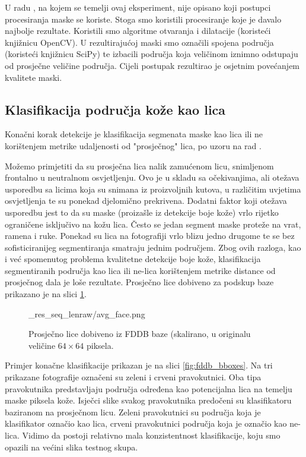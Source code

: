 \documentclass[times, utf8, seminar, numeric]{fer}
\begin{document}
U radu \cite{conf/isda/ChandrappaR12}, na kojem se
temelji ovaj eksperiment, nije opisano koji postupci procesiranja maske se koriste. Stoga smo
koristili procesiranje koje je davalo najbolje rezultate. Koristili smo algoritme otvaranja i
dilatacije (koristeći knjižnicu OpenCV). U rezultirajućoj maski smo označili spojena područja
(koristeći knjižnicu SciPy) te izbacili područja koja veličinom iznimno odstupaju od prosječne
veličine područja. Cijeli postupak rezultirao je osjetnim povećanjem kvalitete maski.

\subsection{Klasifikacija područja kože kao lica}

Konačni korak detekcije je klasifikacija segmenata maske kao lica ili ne korištenjem
metrike udaljenosti od "prosječnog" lica, po uzoru na rad \cite{conf/isda/ChandrappaR12}.


Možemo primjetiti da su prosječna lica nalik zamućenom licu, snimljenom frontalno u neutralnom osvjetljenju.
Ovo je u skladu sa očekivanjima, ali otežava usporedbu sa licima koja su snimana iz proizvoljnih kutova,
u različitim uvjetima osvjetljenja te su ponekad djelomično prekrivena. Dodatni faktor koji otežava usporedbu
jest to da su maske (proizašle iz detekcije boje kože) vrlo rijetko ograničene isključivo na kožu lica. Često
se jedan segment maske proteže na vrat, ramena i ruke. Ponekad su lica na fotografiji vrlo blizu jedno drugome
te se bez sofisticiranijeg segmentiranja smatraju jednim područjem.
Zbog ovih razloga, kao i već spomenutog problema kvalitetne detekcije boje kože, klasifikacija segmentiranih
područja kao lica ili ne-lica korištenjem metrike distance od prosječnog dala je loše rezultate. Prosječno
lice dobiveno za podskup baze prikazano je na slici \ref{fig:fddb_avg_face}.

\begin{figure}[!htb]
\centering
{}_res_seq_len{raw/avg_face.png}
\caption{Prosječno lice dobiveno iz FDDB baze (skalirano, u originalu veličine $64 \times 64$ piksela.}
\label{fig:fddb_avg_face}
\end{figure}

Primjer konačne klasifikacije prikazan je na slici \ref{fig:fddb_bboxes}. Na tri prikazane fotografije
označeni su zeleni i crveni pravokutnici. Oba tipa pravokutnika predstavljaju područja određena
kao potencijalna lica na temelju maske piksela kože. Isječci slike svakog pravokutnika predočeni su
klasifikatoru baziranom na prosječnom licu. Zeleni pravokutnici su područja koja je klasifikator označio
kao lica, crveni pravokutnici područja koja je označio kao ne-lica. Vidimo da postoji relativno mala
konzistentnost klasifikacije, koju smo opazili na većini slika testnog skupa.
\end{document}
